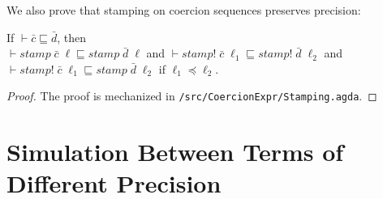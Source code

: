 We also prove that stamping on coercion sequences preserves precision:

\begin{lemma}
\label{lem:cexpr-stamp-sim}
If $\vdash \bar{c} \sqsubseteq \bar{d}$, then \\ $\vdash \mathit{stamp}\;\bar{c}\;\ell \sqsubseteq \mathit{stamp}\;\bar{d}\;\ell$
and $\vdash \mathit{stamp!}\;\bar{c}\;\ell_1 \sqsubseteq \mathit{stamp!}\;\bar{d}\;\ell_2$ and
$\vdash \mathit{stamp!}\;\bar{c}\;\ell_1 \sqsubseteq \mathit{stamp}\;\bar{d}\;\ell_2$ if $\ell_1 \preccurlyeq \ell_2$.
\end{lemma}
\begin{proof}
  The proof is mechanized in \texttt{/src/CoercionExpr/Stamping.agda}.
\end{proof}

\section{Simulation Between \CC Terms of Different Precision}
\label{sec:simulation}

